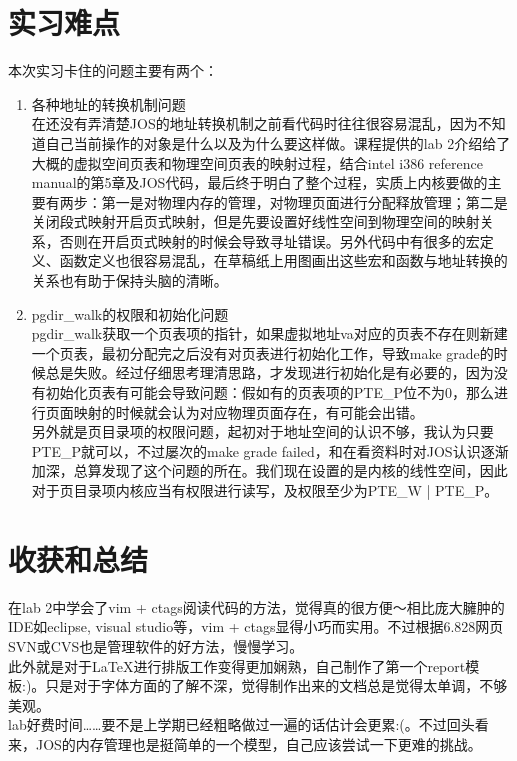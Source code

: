 \documentclass[11pt,a4paper]{article}
\begin{document}
\section{实习难点}
本次实习卡住的问题主要有两个：
\begin{enumerate}
\item 各种地址的转换机制问题\\
在还没有弄清楚JOS的地址转换机制之前看代码时往往很容易混乱，因为不知道自己当前操作的对象是什么以及为什么要这样做。课程提供的lab 2介绍给了大概的虚拟空间页表和物理空间页表的映射过程，结合intel i386 reference manual的第5章及JOS代码，最后终于明白了整个过程，实质上内核要做的主要有两步：第一是对物理内存的管理，对物理页面进行分配释放管理；第二是关闭段式映射开启页式映射，但是先要设置好线性空间到物理空间的映射关系，否则在开启页式映射的时候会导致寻址错误。另外代码中有很多的宏定义、函数定义也很容易混乱，在草稿纸上用图画出这些宏和函数与地址转换的关系也有助于保持头脑的清晰。
\item pgdir\_walk的权限和初始化问题\\
pgdir\_walk获取一个页表项的指针，如果虚拟地址va对应的页表不存在则新建一个页表，最初分配完之后没有对页表进行初始化工作，导致make grade的时候总是失败。经过仔细思考理清思路，才发现进行初始化是有必要的，因为没有初始化页表有可能会导致问题：假如有的页表项的PTE\_P位不为0，那么进行页面映射的时候就会认为对应物理页面存在，有可能会出错。\\
另外就是页目录项的权限问题，起初对于地址空间的认识不够，我认为只要PTE\_P就可以，不过屡次的make grade failed，和在看资料时对JOS认识逐渐加深，总算发现了这个问题的所在。我们现在设置的是内核的线性空间，因此对于页目录项内核应当有权限进行读写，及权限至少为PTE\_W | PTE\_P。
\end{enumerate}

\section{收获和总结}
\hspace{1em} 在lab 2中学会了vim + ctags阅读代码的方法，觉得真的很方便～相比庞大臃肿的IDE如eclipse, visual studio等，vim + ctags显得小巧而实用。不过根据6.828网页SVN或CVS也是管理软件的好方法，慢慢学习。\\
\indent 此外就是对于\LaTeX{}进行排版工作变得更加娴熟，自己制作了第一个report模板:)。只是对于字体方面的了解不深，觉得制作出来的文档总是觉得太单调，不够美观。\\
\indent lab好费时间……要不是上学期已经粗略做过一遍的话估计会更累:(。不过回头看来，JOS的内存管理也是挺简单的一个模型，自己应该尝试一下更难的挑战。
\end{document}
